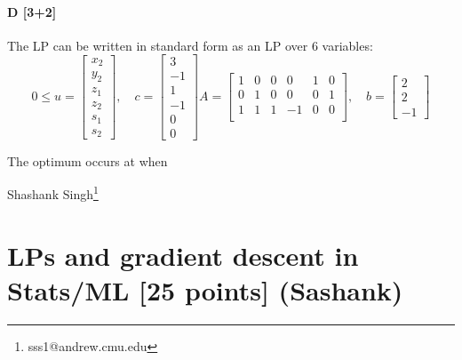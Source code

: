 \documentclass[11pt]{article}
\begin{document}
\paragraph{D [3+2]}
The LP can be written in standard form as an LP over $6$ variables:
\[0 \leq u =
\begin{bmatrix}
x_2 \\
y_2 \\
z_1 \\
z_2 \\
s_1 \\
s_2
\end{bmatrix}, \quad
c =
\begin{bmatrix}
3  \\
-1 \\
1  \\
-1 \\
0  \\
0
\end{bmatrix}
A =
\begin{bmatrix}
1 & 0 & 0 & 0  & 1 & 0 \\
0 & 1 & 0 & 0  & 0 & 1 \\
1 & 1 & 1 & -1 & 0 & 0  \\
\end{bmatrix}, \quad
b =
\begin{bmatrix}
2 \\
2 \\
-1
\end{bmatrix}
\]


The optimum occurs at  when

\newpage
Shashank Singh\footnote{sss1@andrew.cmu.edu}
\section{LPs and gradient descent in Stats/ML [25 points] (Sashank)}
\end{document}
